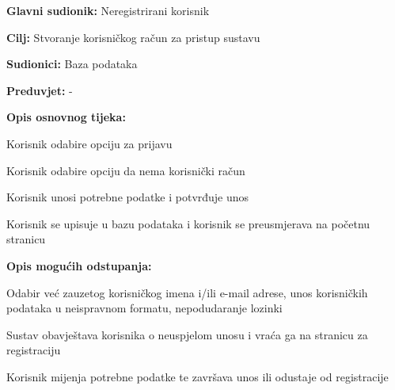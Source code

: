\noindent {}
\begin{packed_item}

	\item \textbf{Glavni sudionik: }Neregistrirani korisnik
	\item  \textbf{Cilj:} Stvoranje korisničkog račun za pristup sustavu
	\item  \textbf{Sudionici:} Baza podataka
	\item  \textbf{Preduvjet:} -
	\item  \textbf{Opis osnovnog tijeka:}

	\item[] \begin{packed_enum}

		\item Korisnik odabire opciju za prijavu
		\item Korisnik odabire opciju da nema korisnički račun
		\item Korisnik unosi potrebne podatke i potvrđuje unos
		\item Korisnik se upisuje u bazu podataka i korisnik se preusmjerava na početnu stranicu
	\end{packed_enum}

	\item  \textbf{Opis mogućih odstupanja:}

	\item[] \begin{packed_item}

		\item[3.a] Odabir već zauzetog korisničkog imena i/ili e-mail adrese, unos korisničkih podataka u neispravnom formatu, nepodudaranje lozinki
		\item[] \begin{packed_enum}

			\item Sustav obavještava korisnika o neuspjelom unosu i vraća ga na stranicu za registraciju
			\item Korisnik mijenja potrebne podatke te završava unos ili odustaje od registracije

		\end{packed_enum}
	\end{packed_item}
\end{packed_item}

